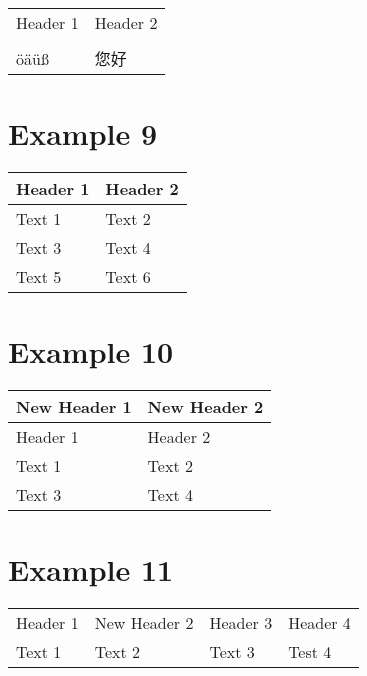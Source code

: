 \begin{longtable}[c]{@{}ll@{}}
\toprule
Header 1 & Header 2\tabularnewline
&\tabularnewline
öäüß & 您好\tabularnewline
\bottomrule
\end{longtable}

\section{Example 9}\label{example-9}

\begin{longtable}[c]{@{}ll@{}}
\toprule
Header 1 & Header 2\tabularnewline
\midrule
\endhead
Text 1 & Text 2\tabularnewline
Text 3 & Text 4\tabularnewline
Text 5 & Text 6\tabularnewline
\bottomrule
\end{longtable}

\section{Example 10}\label{example-10}

\begin{longtable}[c]{@{}ll@{}}
\toprule
New Header 1 & New Header 2\tabularnewline
\midrule
\endhead
Header 1 & Header 2\tabularnewline
Text 1 & Text 2\tabularnewline
Text 3 & Text 4\tabularnewline
\bottomrule
\end{longtable}

\section{Example 11}\label{example-11}

\begin{longtable}[c]{@{}llll@{}}
\toprule
Header 1 & New Header 2 & Header 3 & Header 4\tabularnewline
Text 1 & Text 2 & Text 3 & Test 4\tabularnewline
\bottomrule
\end{longtable}

